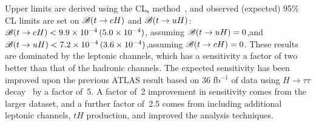 Upper limits are derived using the CL$_{\textrm{s}}$ method~\cite{Junk:1999kv,Read:2002hq}, and  
observed (expected) 95\% CL limits are set on $\mathscr{B}(t\to cH)$ and $\mathscr{B}(t\to uH)$:
$\mathscr{B}(t\to cH)<9.9 \times 10^{-4}\,(5.0 \times 10^{-4})$, assuming $\mathscr{B}(t\to uH)=0$,and $\mathscr{B}(t\to uH)<7.2 \times 10^{-4}\,(3.6 \times 10^{-4})$,assuming $\mathscr{B}(t\to cH)=0$.
These results are dominated by the leptonic channels, which has a sensitivity a factor of two better than that of the hadronic channels.
The expected sensitivity has been improved upon the previous ATLAS result based on 36 fb$^{-1}$ of data using $H\to \tau\tau$ decay~\cite{fcnc36} by a factor of~5. A factor of~2 improvement in sensitivity comes from the larger dataset, and a further factor of~2.5 comes from including
additional leptonic channels, $tH$ production, and improved the analysis techniques.

